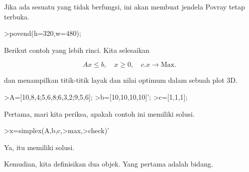 \documentclass[a4paper,10pt]{article}
\begin{document}
\begin{eulernotebook}
\begin{eulercomment}
\begin{eulercomment}
\begin{eulercomment}
Jika ada sesuatu yang tidak berfungsi, ini akan membuat jendela Povray
tetap terbuka.
\end{eulercomment}
\begin{eulerprompt}
>povend(h=320,w=480);
\end{eulerprompt}
\begin{eulercomment}
Berikut contoh yang lebih rinci. Kita selesaikan

\end{eulercomment}
\begin{eulerformula}
\[
Ax \le b, \quad x \ge 0, \quad c.x \to \text{Max.}
\]
\end{eulerformula}
\begin{eulercomment}
dan menampilkan titik-titik layak dan nilai optimum dalam sebuah plot
3D.
\end{eulercomment}
\begin{eulerprompt}
>A=[10,8,4;5,6,8;6,3,2;9,5,6];
>b=[10,10,10,10]';
>c=[1,1,1];
\end{eulerprompt}
\begin{eulercomment}
Pertama, mari kita periksa, apakah contoh ini memiliki solusi.
\end{eulercomment}
\begin{eulerprompt}
>x=simplex(A,b,c,>max,>check)'
\end{eulerprompt}
\begin{euleroutput}
  [0,  1,  0.5]
\end{euleroutput}
\begin{eulercomment}
Ya, itu memiliki solusi.

Kemudian, kita definisikan dua objek. Yang pertama adalah bidang.


\end{eulercomment}
\end{eulercomment}
\end{eulercomment}
\end{eulernotebook}
\end{document}
